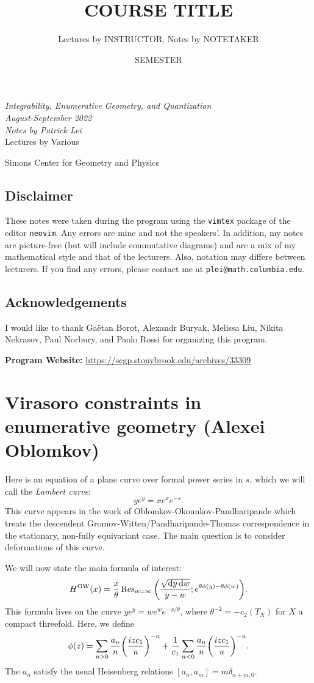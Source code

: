 \documentclass[leqno, openany]{memoir}
\title{COURSE TITLE}
\author{Lectures by INSTRUCTOR, Notes by NOTETAKER}
\date{SEMESTER}
\theoremstyle{definition}
\theoremstyle{remark}
\theoremstyle{plain}
\theoremstyle{definition}
\theoremstyle{remark}
\newcommand{\mr}[1]{\mathrm{#1}}
\newcommand*{\titleSW}
    {\begingroup%
    \raggedleft
    \vspace*{\baselineskip}
    {\Huge\itshape Integrability, Enumerative Geometry, and Quantization \\ August-September 2022}\\[\baselineskip]
    {\large\itshape Notes by Patrick Lei}\\[0.2\textheight]
    {\Large Lectures by Various}\par
    \vfill
    {\Large \sffamily Simons Center for Geometry and Physics}
    \vspace*{\baselineskip}
\endgroup}
\begin{document}
    
\begin{titlingpage}
\titleSW
\end{titlingpage}

\thispagestyle{empty}
\section*{Disclaimer}%
\label{sec:disclaimer}

These notes were taken during the program using the \texttt{vimtex} package of the editor \texttt{neovim}. 
Any errors are mine and not the speakers'. 
In addition, my notes are picture-free (but will include commutative diagrams) and are a mix of my mathematical style and that of the lecturers. Also, notation may differe between lecturers.
If you find any errors, please contact me at \texttt{plei@math.columbia.edu}.

\section*{Acknowledgements}

I would like to thank Ga\"etan Borot, Alexandr Buryak, Melissa Liu, Nikita Nekrasov, Paul Norbury, and Paolo Rossi for organizing this program.

\vspace*{1cm}

\noindent\textbf{Program Website:}  \url{https://scgp.stonybrook.edu/archives/33309}
\newpage

\tableofcontents

\chapter{Virasoro constraints in enumerative geometry (Alexei Oblomkov)}%
\label{cha:alexei}

Here is an equation of a plane curve over formal power series in $s$, which we will call the \textit{Lambert curve}:
\[ ye^y = xe^x e^{-s}. \]
This curve appears in the work of Oblomkov-Okounkov-Pandharipande which treats the descendent Gromov-Witten/Pandharipande-Thomas correspondence in the stationary, non-fully equivariant case. The main question is to consider deformations of this curve.

We will now state the main formula of interest:
\begin{equation}\label{eqn:maineqn} 
    H^{\mr{GW}}(x) = \frac{x}{\theta} \Res_{w=\infty} \qty(\frac{\sqrt{\dd{y} \dd{w}}}{y-w}; e^{\theta \phi(y) - \theta \phi(w)}). 
\end{equation}
This formula lives on the curve $ye^{y} = we^{w} e^{-x/\theta}$, where $\theta^{-2} = -c_2(T_X)$ for $X$ a compact threefold. Here, we define
\[ \phi(z) = \sum_{n > 0} \frac{a_n}{n} \qty(\frac{izc_1}{u})^{-n} + \frac{1}{c_1} \sum_{n < 0} \frac{a_n}{n} \qty(\frac{izc_1}{u})^{-n}. \]
The $a_n$ satisfy the usual Heisenberg relations $[a_n, a_m] = m \delta_{n+m, 0}$.
\end{document}
